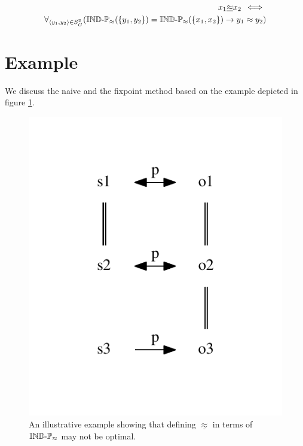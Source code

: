 \documentclass[a4paper]{article}
\begin{document}
\begin{definition}
\begin{align}
\label{def:lower_approximation1}
  x_1 \underline{\approx} x_2
\, \iff \,\\
  \forall_{\langle y_1,y_2\rangle \in S_G^2}(
      \operatorname{{\mathbb{IND}-\mathbb{P}}}_{\approx}(\{y_1,y_2\}) = \operatorname{{\mathbb{IND}-\mathbb{P}}}_{\approx}(\{x_1,x_2\})
    \rightarrow
      y_1 \approx y_2
  )
\end{align}
\end{definition}



\section{Example}
\label{sec:example}

We discuss the naive and the fixpoint method based on the example
  depicted in figure \ref{fig:example}.

\begin{figure}
\label{fig:example}
\centering
\includegraphics{./img/fixpoint_example}%
\caption{
  An illustrative example showing that defining
  $\underline{\approx}$ in terms of $\operatorname{{\mathbb{IND}-\mathbb{P}}}_{\approx}$ may not be optimal.
}
\end{figure}
\end{document}
